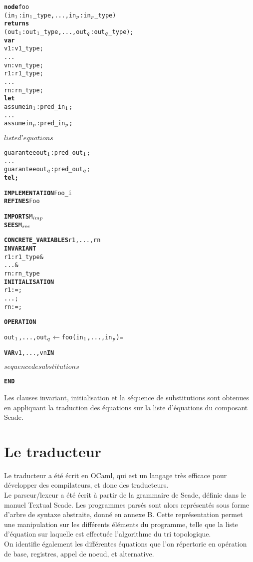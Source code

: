 \setlength{\columnseprule}{0.05cm}
\begin{multicols}{2}
\begin{alltt}
\textbf{node} foo 
  (in\(\sb{1}\): in\(\sb{1}\)\_type, ..., in\(\sb{p}\): in\(\sb{p}\)\_type) 
  \textbf{returns}
  (out\(\sb{1}\): out\(\sb{1}\)\_type, ..., out\(\sb{q}\): out\(\sb{q}\)\_type);
\textbf{var}
  v1 : v1\_type;
  ...
  vn : vn\_type;
  r1 : r1\_type;
  ...
  rn : rn\_type;
\textbf{let}
  assume in\(\sb{1}\) : pred\_in\(\sb{1}\);
  ...
  assume in\(\sb{p}\) : pred\_in\(\sb{p}\);

  \(liste d'equations\)

  guarantee out\(\sb{1}\) : pred\_out\(\sb{1}\);
  ...
  guarantee out\(\sb{q}\) : pred\_out\(\sb{q}\);
\textbf{tel;}
\end{alltt}

\columnbreak

\begin{alltt}
\textbf{IMPLEMENTATION} Foo_i
\textbf{REFINES} Foo

\textbf{IMPORTS} M\(\sb{imp}\)
\textbf{SEES} M\(\sb{see}\)

\textbf{CONCRETE\_VARIABLES} r1, ..., rn
\textbf{INVARIANT}
  r1 : r1\_type &
  ... &
  rn : rn\_type
\textbf{INITIALISATION}
  r1 := ;
  ... ;
  rn := ;

\textbf{OPERATION}

out\(\sb{1}\), ..., out\(\sb{q}\) \(\leftarrow\) foo(in\(\sb{1}\), ..., in\(\sb{p}\)) =
  
\textbf{VAR} v1, ..., vn \textbf{IN}
  
  \(sequence de substitutions\)

\textbf{END}
\end{alltt}
\end{multicols}

Les clauses invariant, initialisation et la séquence de substitutions
sont obtenues en appliquant la traduction des équations
sur la liste d'équations du composant Scade.

\section{Le traducteur}

Le traducteur\cite{Traducteur} a été écrit en OCaml, qui est un langage très efficace
pour développer des compilateurs, et donc des traducteurs.\\
Le parseur/lexeur a été écrit à partir de la grammaire de Scade,
définie dans le manuel Textual Scade\cite{ScadeRef}.
Les programmes parsés sont alors représentés sous forme d'arbre de
syntaxe abstraite, donné en annexe B. Cette représentation permet une
manipulation sur les différents éléments du programme, telle que la
liste d'équation sur laquelle est effectuée l'algorithme du tri
topologique. \\
On identifie également les différentes équations que l'on
répertorie en opération de base, registres, appel de noeud, et
alternative.

